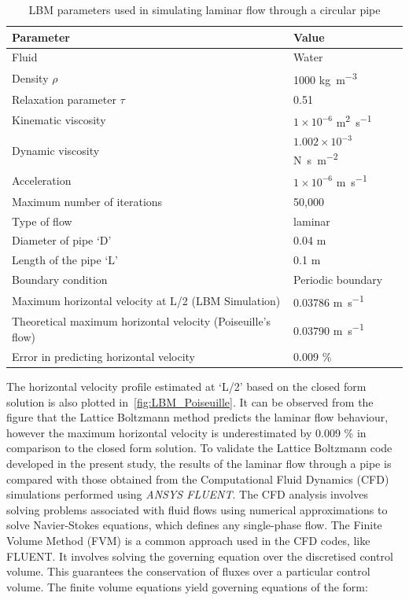 \begin{table}
\caption{LBM parameters used in simulating laminar flow through a circular pipe}
\label{table:lbm}
\centering
\begin{tabular}{ll}
\toprule
\textbf{Parameter} & \textbf{Value} \\ \midrule
Fluid & Water \\ 
Density $\rho$ & 1000 \si{\kilogram\per\metre\cubed}\\ 
Relaxation parameter $\tau$ & 0.51 \\ 
Kinematic viscosity  & $1 \times 10^{-6}$ \si{\metre\squared\per\second} \\ 
Dynamic viscosity & $1.002 \times 10^{-3}$ 
\si{\newton\second\per\metre\squared} \\ 
Acceleration & $1 \times 10^{-6}$ \si{\metre\per\second}\\ 
Maximum number of iterations & 50,000 \\ 
Type of flow & laminar \\ 
Diameter of pipe `D' & 0.04 \si{\metre}\\ 
Length of the pipe `L' & 0.1 \si{\metre} \\ 
Boundary condition & Periodic boundary \\ \midrule
Maximum horizontal velocity at L/2 (LBM Simulation)& 0.03786 
\si{\metre\per\second}\\ 
Theoretical maximum horizontal velocity (Poiseuille's flow) & 0.03790 
\si{\metre\per\second}\\ 
Error in predicting horizontal velocity & 0.009 \% \\ \bottomrule
\end{tabular}
\end{table}

The horizontal velocity profile estimated at `L/2' based on the closed form 
solution is also plotted in~\cref{fig:LBM_Poiseuille}. It can be observed from 
the figure that the Lattice Boltzmann method predicts the laminar flow 
behaviour, however the maximum horizontal velocity is underestimated by 0.009 
\% in comparison to the closed form solution. To validate the Lattice Boltzmann 
code developed in the present study, the results of the laminar flow through a 
pipe is compared with those obtained from the Computational Fluid Dynamics 
(CFD) simulations performed using \textit{ANSYS FLUENT}. The CFD analysis 
involves solving problems associated with fluid flows using numerical 
approximations to solve Navier-Stokes equations, which defines any single-phase 
flow. The Finite Volume Method (FVM) is a common approach used in the CFD 
codes, like FLUENT. It involves solving the governing equation over the 
discretised control volume. This guarantees the conservation of fluxes over a 
particular control volume. The finite volume equations yield governing 
equations of the form:

